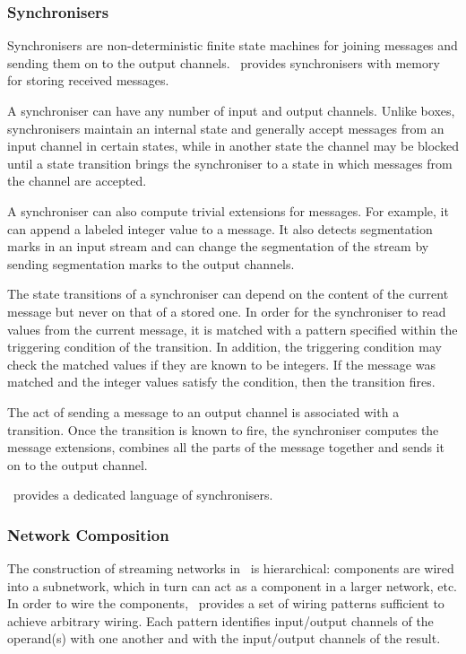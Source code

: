     \subsubsection*{Synchronisers}
Synchronisers are non-deterministic finite state machines for joining messages and sending them on to the output channels. \ak\ provides synchronisers with memory for storing received messages.

A synchroniser can have any number of input and output channels. Unlike boxes, synchronisers maintain an internal state and generally accept messages from an input channel in certain states, while in another state the channel may be blocked until a state transition brings the synchroniser to a state in which messages from the channel are accepted.

A synchroniser can also compute trivial extensions for messages. For example, it can append a labeled integer value to a message. It also detects segmentation marks in an input stream and can change the segmentation of the stream by sending segmentation marks to the output channels.

The state transitions of a synchroniser can depend on the content of the current message but never on that of a stored one. In order for the synchroniser to read values from the current message, it is matched with a pattern specified within the triggering condition of the transition. In addition, the triggering condition may check the matched values if they are known to be integers. If the message was matched and the integer values satisfy the condition, then the transition fires.

The act of sending a message to an output channel is associated with a transition. Once the transition is known to fire, the synchroniser computes the message extensions, combines all the parts of the message together and sends it on to the output channel.

\ak\ provides a dedicated language of synchronisers.


    \subsubsection*{Network Composition}
The construction of streaming networks in \ak\ is hierarchical: components are wired into a subnetwork, which in turn can act as a component in a larger network, etc. In order to wire the components, \ak\ provides a set of wiring patterns sufficient to achieve arbitrary wiring. Each pattern identifies input/output channels of the operand(s) with one another and with the input/output channels of the result.

